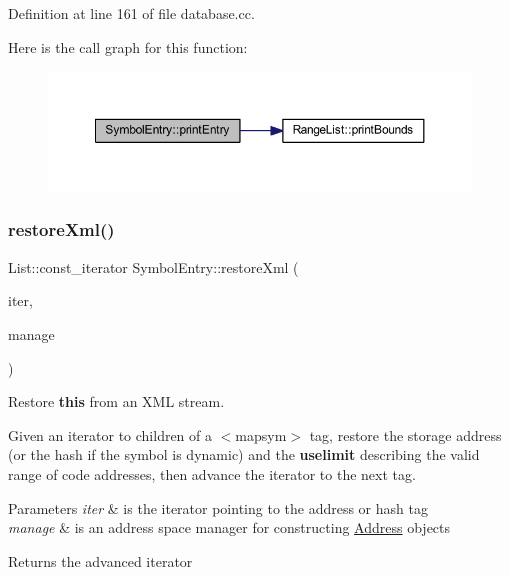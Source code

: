 Definition at line 161 of file database.\+cc.

Here is the call graph for this function\+:
\nopagebreak
\begin{figure}[H]
\begin{center}
\leavevmode
\includegraphics[width=350pt]{class_symbol_entry_a0d46ff3d3aef03da78bd7dfd595bd852_cgraph}
\end{center}
\end{figure}
\mbox{\label{class_symbol_entry_a6117b39bc8d1a12e3cba724dab6dff3f}} 
\subsubsection{\texorpdfstring{restoreXml()}{restoreXml()}}
{\footnotesize\ttfamily List\+::const\+\_\+iterator Symbol\+Entry\+::restore\+Xml (\begin{DoxyParamCaption}\item[{List\+::const\+\_\+iterator}]{iter,  }\item[{const \mbox{\hyperlink{class_addr_space_manager}{Addr\+Space\+Manager}} $\ast$}]{manage }\end{DoxyParamCaption})}



Restore {\bfseries{this}} from an X\+ML stream. 

Given an iterator to children of a $<$mapsym$>$ tag, restore the storage address (or the hash if the symbol is dynamic) and the {\bfseries{uselimit}} describing the valid range of code addresses, then advance the iterator to the next tag. 
\begin{DoxyParams}{Parameters}
{\em iter} & is the iterator pointing to the address or hash tag \\
\hline
{\em manage} & is an address space manager for constructing \mbox{\hyperlink{class_address}{Address}} objects \\
\hline
\end{DoxyParams}
\begin{DoxyReturn}{Returns}
the advanced iterator 
\end{DoxyReturn}


